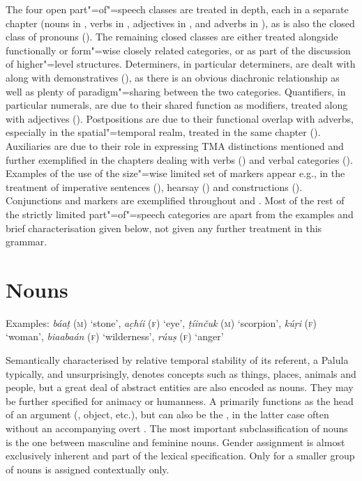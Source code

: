 The four open part"=of"=speech classes are treated in depth, each in a separate chapter (nouns in , verbs in , adjectives in , and adverbs in ), as is also the closed class of pronouns (). The remaining closed classes are either treated alongside functionally or form"=wise closely related categories, or as part of the discussion of higher"=level structures. Determiners, in particular  determiners, are dealt with along with  demonstratives (), as there is an obvious diachronic relationship as well as plenty of paradigm"=sharing between the two categories. Quantifiers, in particular numerals, are due to their shared function as  modifiers, treated along with adjectives (). Postpositions are due to their functional overlap with adverbs, especially in the spatial"=temporal realm, treated in the same chapter (). Auxiliaries are due to their role in expressing TMA distinctions mentioned and further exemplified in the chapters dealing with verbs () and verbal categories (). Examples of the use of the size"=wise limited set of  markers appear e.g., in the treatment of imperative sentences (), hearsay () and  constructions (). Conjunctions and  markers are exemplified throughout  and . Most of the rest of the strictly limited part"=of"=speech categories are apart from the examples and brief characterisation given below, not given any further treatment in this grammar.


\section{Nouns}
\label{sec:3b-2}

\largerpage
Examples: \textit{báaṭ} (\textsc{m}) `stone', \textit{ac̣híi} (\textsc{f}) `eye', \textit{ṭíinčuk} (\textsc{m}) `scorpion', \textit{kúṛi} (\textsc{f}) `woman',  \textit{biaabaán} (\textsc{f}) `wilderness', \textit{rúuṣ} (\textsc{f}) `anger'


Semantically characterised by relative temporal stability of its referent, a Palula  typically, and unsurprisingly, denotes concepts such as things, places, animals and people, but a great deal of abstract entities are also encoded as nouns. They may be further specified for animacy or humanness. A  primarily functions as the head of an argument (, object, etc.), but can also be the , in the latter case often without an accompanying overt . The most important subclassification of nouns is the one between masculine and feminine  nouns. Gender assignment is almost exclusively inherent and part of the lexical specification. Only for a smaller group of nouns is  assigned contextually only.


